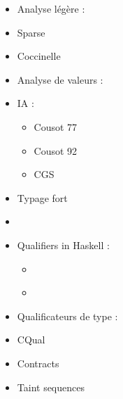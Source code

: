 \begin{itemize}
\item
  Analyse légère :
\item
  Sparse \cite{TorvaldsSparse}
\item
  Coccinelle \cite{coccinelle09} \cite{coccinelle11} 
\item
  Analyse de valeurs :
\item
  IA :
  \begin{itemize}
  \item
    Cousot 77 \cite{Cousot77}
  \item
    Cousot 92 \cite{Cousot92-1}
  \item
    CGS \cite{cgs}
  \end{itemize}
\item
  Typage fort
\item
  \cite{TAPL}
\item
  Qualifiers in Haskell :
  \begin{itemize}
  \item
    \cite{lightweight-static-capabilities}
  \item
    \cite{LZ06a}
  \end{itemize}
\item
  Qualificateurs de type :
\item
  CQual \cite{pldi99,usenix01,pldi02,cquk-usenix04,toplas-quals}
\item
  Contracts \cite{cssv}
\item
  Taint sequences \cite{mdv10}
\end{itemize}

